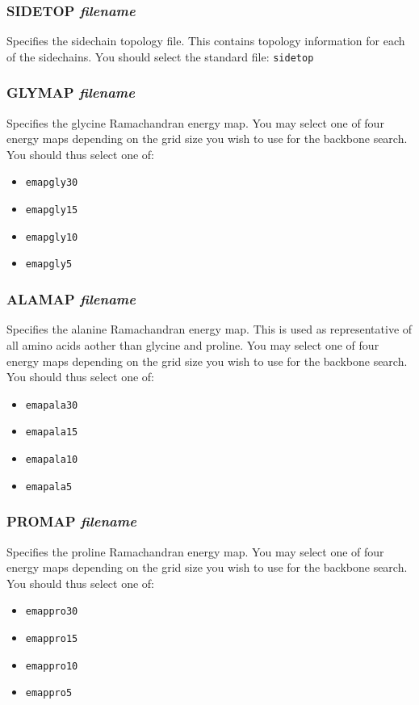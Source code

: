 \documentclass{report}
\newcommand{\es}{\relax}
\begin{document}
\subsubsection{SIDETOP {\em filename}}
\es
Specifies the sidechain topology file. This contains topology information
for each of the sidechains. You should select the standard file:
{\tt sidetop}

\subsubsection{GLYMAP {\em filename}}
\es
Specifies the glycine Ramachandran energy map. You may select one of four
energy maps depending on the grid size you wish to use for the backbone
search. You should thus select one of:
\begin{itemize}
\item {\tt emapgly30}
\item {\tt emapgly15}
\item {\tt emapgly10}
\item {\tt emapgly5}
\end{itemize}

\subsubsection{ALAMAP {\em filename}}
\es
Specifies the alanine Ramachandran energy map. This is used as representative
of all amino acids aother than glycine and proline. You may select one of four
energy maps depending on the grid size you wish to use for the backbone
search. You should thus select one of:
\begin{itemize}
\item {\tt emapala30}
\item {\tt emapala15}
\item {\tt emapala10}
\item {\tt emapala5}
\end{itemize}

\subsubsection{PROMAP {\em filename}}
\es
Specifies the proline Ramachandran energy map. You may select one of four
energy maps depending on the grid size you wish to use for the backbone
search. You should thus select one of:
\begin{itemize}
\item {\tt emappro30}
\item {\tt emappro15}
\item {\tt emappro10}
\item {\tt emappro5}
\end{itemize}
\end{document}
